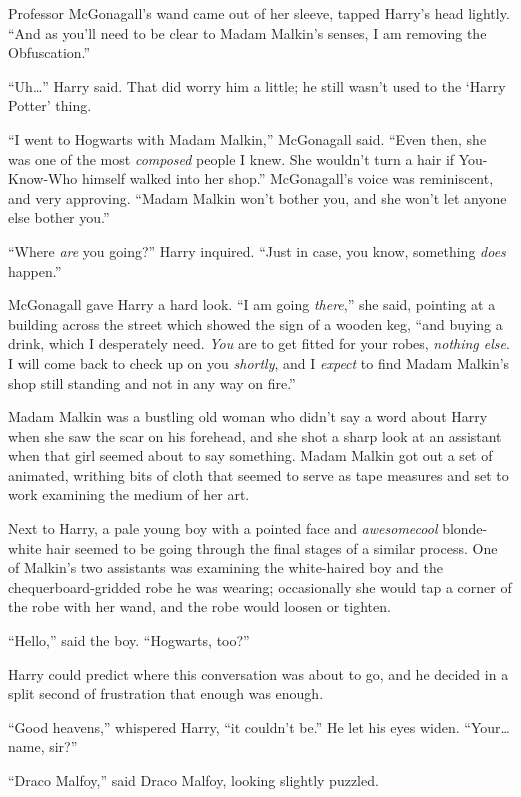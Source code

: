 Professor McGonagall’s wand came out of her sleeve, tapped Harry’s head lightly. “And as you’ll need to be clear to Madam Malkin’s senses, I am removing the Obfuscation.”

“Uh…” Harry said. That did worry him a little; he still wasn’t used to the ‘Harry Potter’ thing.

“I went to Hogwarts with Madam Malkin,” McGonagall said. “Even then, she was one of the most \emph{composed} people I knew. She wouldn’t turn a hair if You-Know-Who himself walked into her shop.” McGonagall’s voice was reminiscent, and very approving. “Madam Malkin won’t bother you, and she won’t let anyone else bother you.”

“Where \emph{are} you going?” Harry inquired. “Just in case, you know, something \emph{does} happen.”

McGonagall gave Harry a hard look. “I am going \emph{there},” she said, pointing at a building across the street which showed the sign of a wooden keg, “and buying a drink, which I desperately need. \emph{You} are to get fitted for your robes, \emph{nothing else}. I will come back to check up on you \emph{shortly}, and I \emph{expect} to find Madam Malkin’s shop still standing and not in any way on fire.”

Madam Malkin was a bustling old woman who didn’t say a word about Harry when she saw the scar on his forehead, and she shot a sharp look at an assistant when that girl seemed about to say something. Madam Malkin got out a set of animated, writhing bits of cloth that seemed to serve as tape measures and set to work examining the medium of her art.

Next to Harry, a pale young boy with a pointed face and \emph{awesomecool} blonde-white hair seemed to be going through the final stages of a similar process. One of Malkin’s two assistants was examining the white-haired boy and the chequerboard-gridded robe he was wearing; occasionally she would tap a corner of the robe with her wand, and the robe would loosen or tighten.

“Hello,” said the boy. “Hogwarts, too?”

Harry could predict where this conversation was about to go, and he decided in a split second of frustration that enough was enough.

“Good heavens,” whispered Harry, “it couldn’t be.” He let his eyes widen. “Your…name, sir?”

“Draco Malfoy,” said Draco Malfoy, looking slightly puzzled.


